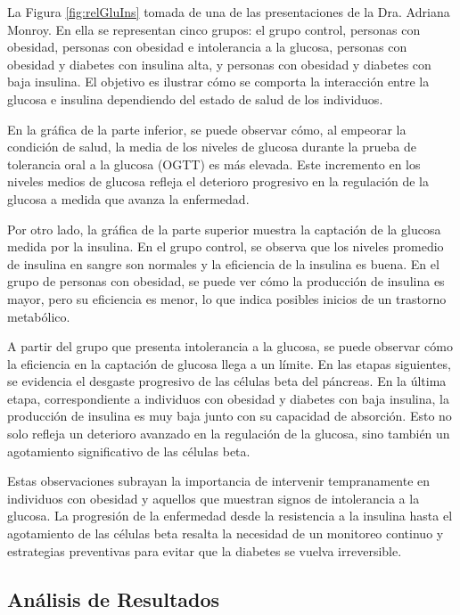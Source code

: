 La Figura \ref{fig:relGluIns} tomada de una de las presentaciones de la Dra. Adriana Monroy. En ella se representan cinco grupos: el grupo control, personas con obesidad, personas con obesidad e intolerancia a la glucosa, personas con obesidad y diabetes con insulina alta, y personas con obesidad y diabetes con baja insulina. El objetivo es ilustrar cómo se comporta la interacción entre la glucosa e insulina dependiendo del estado de salud de los individuos.

En la gráfica de la parte inferior, se puede observar cómo, al empeorar la condición de salud, la media de los niveles de glucosa durante la prueba de tolerancia oral a la glucosa (OGTT) es más elevada. Este incremento en los niveles medios de glucosa refleja el deterioro progresivo en la regulación de la glucosa a medida que avanza la enfermedad.

Por otro lado, la gráfica de la parte superior muestra la captación de la glucosa medida por la insulina. En el grupo control, se observa que los niveles promedio de insulina en sangre son normales y la eficiencia de la insulina es buena. En el grupo de personas con obesidad, se puede ver cómo la producción de insulina es mayor, pero su eficiencia es menor, lo que indica posibles inicios de un trastorno metabólico.

A partir del grupo que presenta intolerancia a la glucosa, se puede observar cómo la eficiencia en la captación de glucosa llega a un límite. En las etapas siguientes, se evidencia el desgaste progresivo de las células beta del páncreas. En la última etapa, correspondiente a individuos con obesidad y diabetes con baja insulina, la producción de insulina es muy baja junto con su capacidad de absorción. Esto no solo refleja un deterioro avanzado en la regulación de la glucosa, sino también un agotamiento significativo de las células beta.

Estas observaciones subrayan la importancia de intervenir tempranamente en individuos con obesidad y aquellos que muestran signos de intolerancia a la glucosa. La progresión de la enfermedad desde la resistencia a la insulina hasta el agotamiento de las células beta resalta la necesidad de un monitoreo continuo y estrategias preventivas para evitar que la diabetes se vuelva irreversible.

\subsection{Análisis de Resultados}

